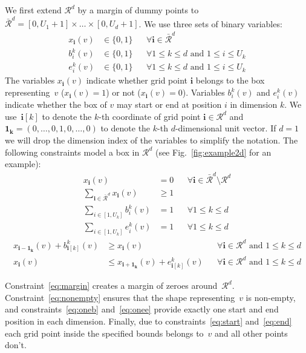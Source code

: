 \documentclass[runningheads]{llncs}
\newcommand{\bvec}[1]{\mathbf{#1}}
\newcounter{constr}
\begin{document}
We first extend $\mathcal R^d$ by a margin of dummy points to $\bar{\mathcal R}^d = [0,U_1+1] \times \ldots \times [0, U_d+1]$.
We use three sets of binary variables:
\begin{align}
  \label{eq:x} x_\bvec{i}(v) &\in \{0,1\} && \forall \bvec{i} \in \bar{\mathcal R}^d\\
  \label{eq:b} b_i^{k}(v) &\in \{0,1\} && \forall 1\le k \le d \text{ and } 1\le i \le U_k\\
  \label{eq:e} e_i^{k}(v) &\in \{0,1\} && \forall 1\le k \le d \text{ and } 1\le i \le U_k
\end{align}
The variables $x_\bvec{i}(v)$ indicate whether grid point $\bvec{i}$ belongs to the box representing~$v$ ($x_\bvec{i}(v)=1$) or not ($x_\bvec{i}(v)=0$). Variables $b_i^{k}(v)$ and $e_i^{k}(v)$ indicate whether the box of $v$ may start or end at position $i$ in dimension $k$. We use~$\bvec{i}[k]$ to denote the $k$-th coordinate of grid point $\bvec{i} \in \mathcal R^d$ and $\bvec{1_k} = (0,\dots,0,1,0,\dots,0)$ to denote the $k$-th $d$-dimensional unit vector. If $d=1$ we will drop the dimension index of the variables to simplify the notation.
The following constraints model a box in $\mathcal R^d$ (see Fig.~\ref{fig:example2d} for an example): \begin{align} 
\label{eq:margin} x_\bvec{i}(v) &= 0 && \forall \bvec{i} \in \bar{\mathcal R}^d \setminus \mathcal R^d\\
\label{eq:nonempty} \sum_{\bvec{i}\in \bar{\mathcal R}^d } x_\bvec{i}(v) & \ge 1 &\\
\label{eq:oneb} \sum_{{i \in [1,U_k]}} b_{i}^k(v) & = 1 &&\forall 1
\le k \le d\\
\label{eq:onee} \sum_{{i \in [1,U_k]}} e_{i}^k(v) & = 1 && \forall 1
\le k \le d
\end{align}
\begin{align}
\label{eq:start} x_\bvec{i-1_k}(v) + b_{\bvec{i}[k]}^k(v) &\ge 
x_\bvec{i}(v) && \forall \bvec{i} \in \mathcal R^d \text{ and } 1 \le
k \le d\\
\label{eq:end} x_\bvec{i}(v) &\le x_\bvec{i+1_k}(v) + e_{\bvec{i}[k]}^k(v) && \forall \bvec{i} \in \mathcal R^d \text{ and } 1 \le k \le d
\end{align}

Constraint~\eqref{eq:margin} creates a margin of zeroes
around~$\mathcal R^d$.
Constraint~\eqref{eq:nonempty} ensures that the shape representing~$v$
is non-empty, and constraints~\eqref{eq:oneb} and~\eqref{eq:onee}
provide exactly one start and end position in each dimension.
Finally, due to constraints~\eqref{eq:start} and~\eqref{eq:end} each
grid point inside the specified bounds belongs to~$v$ and all other
points don't.
\end{document}

